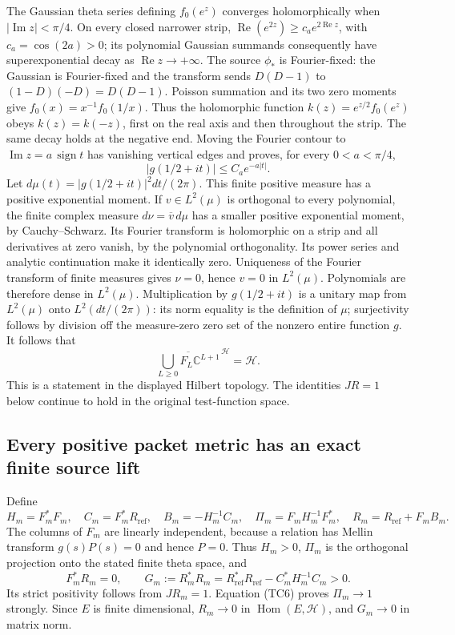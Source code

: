The Gaussian theta series defining \(f_0(e^z)\) converges holomorphically
when \(|\operatorname{Im}z|<\pi/4\).  On every closed narrower strip,
\(\operatorname{Re}(e^{2z})\geq c_a e^{2\operatorname{Re}z}\), with
\(c_a=\cos(2a)>0\); its polynomial Gaussian summands consequently have
superexponential decay as \(\operatorname{Re}z\to+\infty\).
The source \(\phi_*\) is Fourier-fixed: the Gaussian is Fourier-fixed
and the transform sends \(D(D-1)\) to \((1-D)(-D)=D(D-1)\).
Poisson summation and its two zero moments give
\(f_0(x)=x^{-1}f_0(1/x)\).
Thus the holomorphic function
\(k(z)=e^{z/2}f_0(e^z)\) obeys \(k(z)=k(-z)\), first on the real axis
and then throughout the strip.  The same decay holds at the negative
end.  Moving the Fourier contour to
\(\operatorname{Im}z=a\,\operatorname{sign}t\) has vanishing vertical
edges and proves, for every \(0<a<\pi/4\),
\[
 |g(1/2+it)|\leq C_a e^{-a|t|}.
 \tag{TC5}
\]
Let \(d\mu(t)=|g(1/2+it)|^2dt/(2\pi)\).  This finite positive measure
has a positive exponential moment.  If \(v\in L^2(\mu)\) is orthogonal
to every polynomial, the finite complex measure
\(d\nu=\overline v\,d\mu\) has a smaller positive exponential moment,
by Cauchy--Schwarz.  Its Fourier transform is holomorphic on a strip
and all derivatives at zero vanish, by the polynomial orthogonality.
Its power series and analytic continuation make it identically zero.
Uniqueness of the Fourier transform of finite measures gives
\(\nu=0\), hence \(v=0\) in \(L^2(\mu)\).
Polynomials are therefore dense in \(L^2(\mu)\).
Multiplication by \(g(1/2+it)\) is a unitary map from \(L^2(\mu)\)
onto \(L^2(dt/(2\pi))\): its norm equality is the definition of \(\mu\);
surjectivity follows by division off the measure-zero zero set of the
nonzero entire function \(g\).  It follows that
\[
 \overline{\bigcup_{L\geq0}F_L\mathbb C^{L+1}}^{\,\mathcal H}
      =\mathcal H .
 \tag{TC6}
\]
This is a statement in the displayed Hilbert topology.  The identities
\(JR=1\) below continue to hold in the original test-function space.

\subsection{Every positive packet metric has an exact finite source lift}

Define
\[
 H_m=F_m^*F_m,\quad C_m=F_m^*R_{\mathrm{ref}},\quad
 B_m=-H_m^{-1}C_m,\quad
 \Pi_m=F_mH_m^{-1}F_m^*,\quad R_m=R_{\mathrm{ref}}+F_mB_m .
 \tag{TC7}
\]
The columns of \(F_m\) are linearly independent, because a relation
has Mellin transform \(g(s)P(s)=0\) and hence \(P=0\).
Thus \(H_m>0\), \(\Pi_m\) is the orthogonal projection onto the stated
finite theta space, and
\[
 F_m^*R_m=0,\qquad
 G_m:=R_m^*R_m=R_{\mathrm{ref}}^*R_{\mathrm{ref}}-C_m^*H_m^{-1}C_m>0.
 \tag{TC8}
\]
Its strict positivity follows from \(JR_m=1\).
Equation (TC6) proves \(\Pi_m\to1\) strongly.  Since \(E\) is finite
dimensional, \(R_m\to0\) in \(\operatorname{Hom}(E,\mathcal H)\),
and \(G_m\to0\) in matrix norm.

